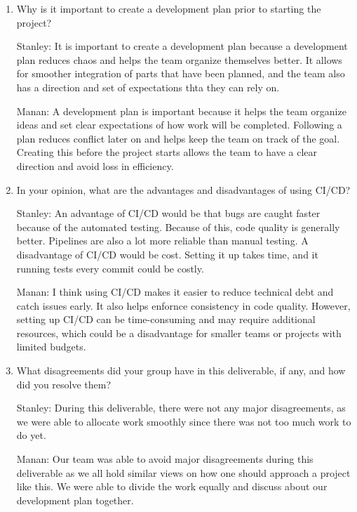 \documentclass{article}
\begin{document}



\begin{enumerate}
    \item Why is it important to create a development plan prior to starting the
    project?

Stanley: It is important to create a development plan because a development plan reduces chaos and helps the team organize themselves better. It allows for smoother integration of parts that have been planned, and the team also has a direction and set of expectations thta they can rely on. 

Manan: A development plan is important because it helps the team organize ideas and set clear expectations of how work will be completed. Following a plan reduces conflict later on and helps keep the team on track of the goal. Creating this before the project starts allows the team to have a clear direction and avoid loss in efficiency.

    \item In your opinion, what are the advantages and disadvantages of using
    CI/CD?

Stanley: An advantage of CI/CD would be that bugs are caught faster because of the automated testing. Because of this, code quality is generally better. Pipelines are also a lot more reliable than manual testing. A disadvantage of CI/CD would be cost. Setting it up takes time, and it running tests every commit could be costly.

Manan: I think using CI/CD makes it easier to reduce technical debt and catch issues early. It also helps enfornce consistency in code quality. However, setting up CI/CD can be time-consuming and may require additional resources, which could be a disadvantage for smaller teams or projects with limited budgets.

    \item What disagreements did your group have in this deliverable, if any,
    and how did you resolve them?

Stanley: During this deliverable, there were not any major disagreements, as we were able to allocate work smoothly since there was not too much work to do yet.

Manan: Our team was able to avoid major disagreements during this deliverable as we all hold similar views on how one should approach a project like this. We were able to divide the work equally and discuss about our development plan together.
\end{enumerate}
\end{document}
